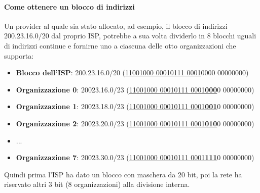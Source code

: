 \documentclass[11pt,a4paper]{book}
\begin{document}
\paragraph{Come ottenere un blocco di indirizzi}
Un provider al quale sia stato allocato, ad esempio, il blocco di indirizzi 200.23.16.0/20 dal proprio ISP, potrebbe a sua volta dividerlo in 8 blocchi uguali di indirizzi continue e fornirne uno a ciascuna delle otto organizzazioni che supporta:
\begin{itemize}
	\item \textbf{Blocco dell'ISP}: 200.23.16.0/20 (\underline{11001000 00010111 0001}0000 00000000)
	\item \textbf{Organizzazione 0}: 20023.16.0/23 (\underline{11001000 00010111 0001\textbf{000}}0 00000000)
	\item \textbf{Organizzazione 1}: 20023.18.0/23 (\underline{11001000 00010111 0001\textbf{001}}0 00000000)
	\item \textbf{Organizzazione 2}: 20023.20.0/23 (\underline{11001000 00010111 0001\textbf{010}}0 00000000)
	\item ...
	\item \textbf{Organizzazione 7}: 20023.30.0/23 (\underline{11001000 00010111 0001\textbf{111}}0 00000000)
\end{itemize}
Quindi prima l'ISP ha dato un blocco con maschera da 20 bit, poi la rete ha riservato altri 3 bit (8 organizzazioni) alla divisione interna. 
\end{document}
